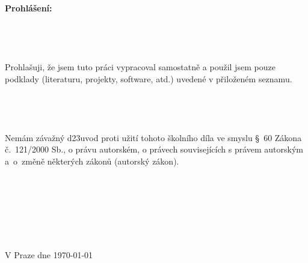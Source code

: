 \null\vfill \thispagestyle{empty}
{\bf Prohl\' a\v sen\' i:} \\
\\
\\
\\
\\
Prohla\v suji, \v ze jsem tuto pr\' aci vypracoval samostatn\v e
a pou\v zil jsem pouze podklady (literaturu, projekty, software, atd.) uveden\' e
v p\v rilo\v zen\' em seznamu. \\
\\
\\
\\
\\
Nem\' am z\' ava\v zn\'y d\accent23uvod proti u\v zit\' i tohoto \v skoln\' iho d\' ila ve smyslu \S\ 60
Z\' akona \v c.\ 121/2000 Sb., o pr\' avu autorsk\' em, o pr\' avech souvisej\' ic\' ich
s pr\' avem autorsk\' ym a~o~zm\v en\v e n\v ekter\' ych z\'akon\r u (autorsk\'y z\' akon). \\ 
\\
\\
\\
\\
\\
\\
\\
{V Praze dne \czechdate\today}\hfill \myself
%
%
%
%
%
%
\newpage

